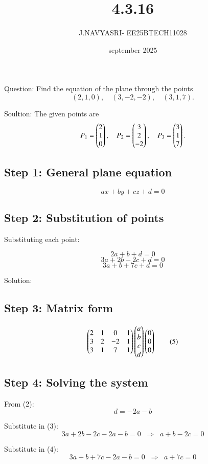 \documentclass{beamer}
\title %
{4.3.16}
\date{september 2025}
\author %
{J.NAVYASRI- EE25BTECH11028}
\begin{document}
\frame{\titlepage}
\begin{frame}{Question:}
Find the equation of the plane through the points  
\[
(2,1,0), \quad (3,-2,-2), \quad (3,1,7).
\]
\end{frame}

\begin{frame}{Soultion:}
The given points are
\[
P_1 = \begin{pmatrix}2\\1\\0\end{pmatrix}, \quad 
P_2 = \begin{pmatrix}3\\2\\-2\end{pmatrix}, \quad 
P_3 = \begin{pmatrix}3\\1\\7\end{pmatrix}.
\]
\subsection*{Step 1: General plane equation}
\[
ax + by + cz + d = 0 \tag{1}
\]
\subsection*{Step 2: Substitution of points}
Substituting each point:

\[
2a + b + d = 0 \tag{2}
\]
\[
3a + 2b - 2c + d = 0 \tag{3}
\]
\[
3a + b + 7c + d = 0 \tag{4}
\]
\end{frame}

\begin{frame}{Solution:}
\subsection*{Step 3: Matrix form}
\[
\begin{pmatrix}
2 & 1 & 0 & 1\\
3 & 2 & -2 & 1\\
3 & 1 & 7 & 1
\end{pmatrix}
\begin{pmatrix}a\\ b\\ c\\ d\end{pmatrix}
\begin{pmatrix}0\\0\\0\end{pmatrix}
\tag{5}
\]
\subsection*{Step 4: Solving the system}
From (2):
\[
d = -2a - b \tag{6}
\]

Substitute in (3):
\[
3a + 2b - 2c - 2a - b = 0 \;\;\Rightarrow\;\; a + b - 2c = 0 \tag{7}
\]

Substitute in (4):
\[
3a + b + 7c - 2a - b = 0 \;\;\Rightarrow\;\; a + 7c = 0 \tag{8}
\]
\end{frame}
\end{document}
